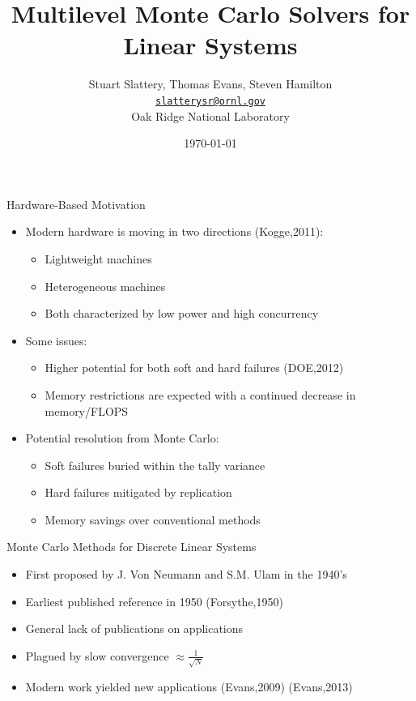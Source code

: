 \documentclass{beamer}
\author[Stuart Slattery]{Stuart Slattery, Thomas Evans, Steven
  Hamilton\\
  \bigskip
  \href{mailto:slatterysr@ornl.gov}{\texttt{slatterysr@ornl.gov}} \\
  \bigskip
  Oak Ridge National Laboratory}
\date{\today}
\title[Multilevel Monte Carlo Solvers \hspace{1mm}
  \insertframenumber/\inserttotalframenumber]{Multilevel Monte Carlo
  Solvers for Linear Systems}
\begin{document}
\maketitle

\begin{frame}{Hardware-Based Motivation}

  \begin{itemize}
  \item Modern hardware is moving in two directions (Kogge,2011):
    \begin{itemize}
    \item Lightweight machines
    \item Heterogeneous machines
    \item Both characterized by low power and high concurrency
    \end{itemize}
    \medskip \medskip
  \item Some issues:
    \begin{itemize}
    \item Higher potential for both soft and hard failures (DOE,2012)
    \item Memory restrictions are expected with a continued decrease
      in memory/FLOPS
    \end{itemize}
    \medskip \medskip
  \item Potential resolution from Monte Carlo:
    \begin{itemize}
    \item Soft failures buried within the tally variance
    \item Hard failures mitigated by replication
    \item Memory savings over conventional methods
    \end{itemize}
  \end{itemize}

\end{frame}

\begin{frame}{Monte Carlo Methods for Discrete Linear Systems}

  \begin{itemize}
  \item First proposed by J. Von Neumann and S.M. Ulam in the 1940's
    \medskip \medskip
  \item Earliest published reference in 1950 (Forsythe,1950)
    \medskip \medskip
  \item General lack of publications on applications
    \medskip \medskip
  \item Plagued by slow convergence $\approx \frac{1}{\sqrt{N}}$
    \medskip \medskip
  \item Modern work yielded new applications (Evans,2009) (Evans,2013)
  \end{itemize}

\end{frame}
\end{document}
